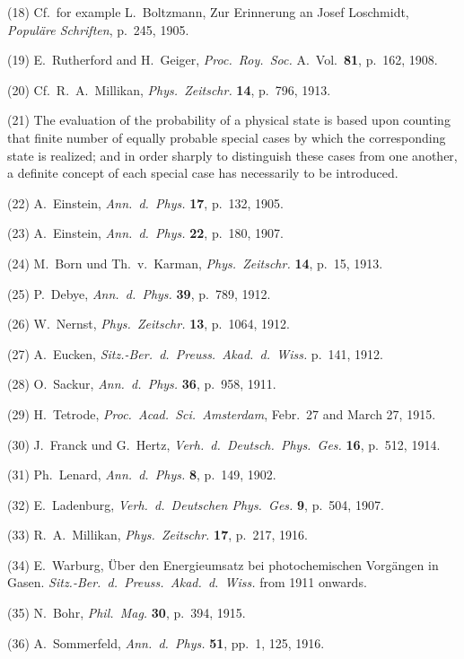 \documentclass[12pt,oneside]{book}
\begin{document}
(18) Cf.\ for example L.~Boltzmann, Zur Erinnerung an Josef Loschmidt, \textit{Popul\"{a}re Schriften}, p.\ 245, 1905.

(19) E.~Rutherford and H.~Geiger, \textit{Proc.\ Roy.\ Soc.} A.\ Vol.\ \textbf{81}, p.\ 162, 1908.

(20) Cf.\ R.~A.~Millikan, \textit{Phys.\ Zeitschr.} \textbf{14}, p.\ 796, 1913.

(21) The evaluation of the probability of a physical state is based
upon counting that finite number of equally probable special cases
by which the corresponding state is realized; and in order sharply
to distinguish these cases from one another, a definite concept of each
special case has necessarily to be introduced.

(22) A.~Einstein, \textit{Ann.\ d.\ Phys.} \textbf{17}, p.\ 132, 1905.

(23) A.~Einstein, \textit{Ann.\ d.\ Phys.} \textbf{22}, p.\ 180, 1907.

(24) M.~Born und Th.~v.~Karman, \textit{Phys.\ Zeitschr.} \textbf{14}, p.\ 15, 1913.

(25) P.~Debye, \textit{Ann.\ d.\ Phys.} \textbf{39}, p.\ 789, 1912.

(26) W.~Nernst, \textit{Phys.\ Zeitschr.} \textbf{13}, p.\ 1064, 1912.

(27) A.~Eucken, \textit{Sitz.-Ber.\ d.\ Preuss.\ Akad.\ d.\ Wiss.} p.\ 141, 1912.

(28) O.~Sackur, \textit{Ann.\ d.\ Phys.} \textbf{36}, p.\ 958, 1911.

(29) H.~Tetrode, \textit{Proc.\ Acad.\ Sci.\ Amsterdam}, Febr.\ 27 and March 27, 1915.

(30) J.~Franck und G.~Hertz, \textit{Verh.\ d.\ Deutsch.\ Phys.\ Ges.} \textbf{16}, p.\ 512, 1914.

(31) Ph.~Lenard, \textit{Ann.\ d.\ Phys.} \textbf{8}, p.\ 149, 1902.

(32) E.~Ladenburg, \textit{Verh.\ d.\ Deutschen Phys.\ Ges.} \textbf{9}, p.\ 504, 1907.

(33) R.~A.~Millikan, \textit{Phys.\ Zeitschr.} \textbf{17}, p.\ 217, 1916.

(34) E.~Warburg, \"{U}ber den Energieumsatz bei photochemischen Vorg\"{a}ngen in Gasen.
\textit{Sitz.-Ber.\ d.\ Preuss.\ Akad.\ d.\ Wiss.} from 1911 onwards.

(35) N.~Bohr, \textit{Phil.\ Mag.} \textbf{30}, p.\ 394, 1915.

(36) A.~Sommerfeld, \textit{Ann.\ d.\ Phys.} \textbf{51}, pp.\ 1, 125, 1916.
\end{document}
